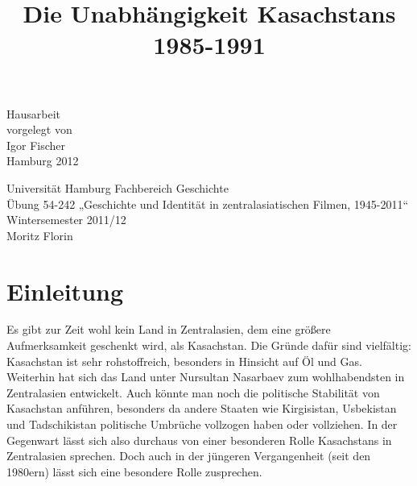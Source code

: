 \documentclass[12pt,headsepline,a4paper]{scrartcl}
\begin{document}
\begin{titlepage}
\date{}
\author{}

\title{\Large Die Unabhängigkeit Kasachstans 1985-1991}
{\let\newpage\relax\maketitle}

\begin{center}
\vfill
Hausarbeit\\
vorgelegt von\\
Igor Fischer \\
\null
Hamburg 2012
\vfill
\end{center}

\begin{minipage}{0.5\textwidth}
\begin{flushleft} 
Universität Hamburg
Fachbereich Geschichte\\
Übung 54-242 „Geschichte und Identität in zentralasiatischen Filmen, 1945-2011“\\
Wintersemester 2011/12\\
Moritz Florin\\
\end{flushleft}
\end{minipage}
\vline
\begin{minipage}{0.5\textwidth}
\end{minipage}

\end{titlepage}

\tableofcontents
\thispagestyle{empty}
\newpage

\section*{Einleitung}

Es gibt zur Zeit wohl kein Land in Zentralasien, dem eine größere Aufmerksamkeit
geschenkt wird, als Kasachstan. Die Gründe dafür sind vielfältig: Kasachstan ist sehr
rohstoffreich, besonders in Hinsicht auf Öl und Gas. Weiterhin hat sich das Land unter
Nursultan Nasarbaev zum wohlhabendsten in Zentralasien entwickelt. Auch könnte
man noch die politische Stabilität von Kasachstan anführen, besonders da andere
Staaten wie Kirgisistan, Usbekistan und Tadschikistan politische Umbrüche vollzogen
haben oder vollziehen. In der Gegenwart lässt sich also durchaus von einer besonderen
Rolle Kasachstans in Zentralasien sprechen. Doch auch in der jüngeren Vergangenheit
(seit den 1980ern) lässt sich eine besondere Rolle zusprechen.
\end{document}
